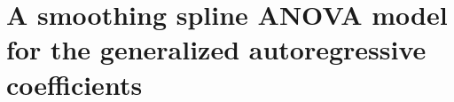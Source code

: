 


\section{A smoothing spline ANOVA model for the generalized autoregressive coefficients}\label{RKHS-framework-for-phi}



